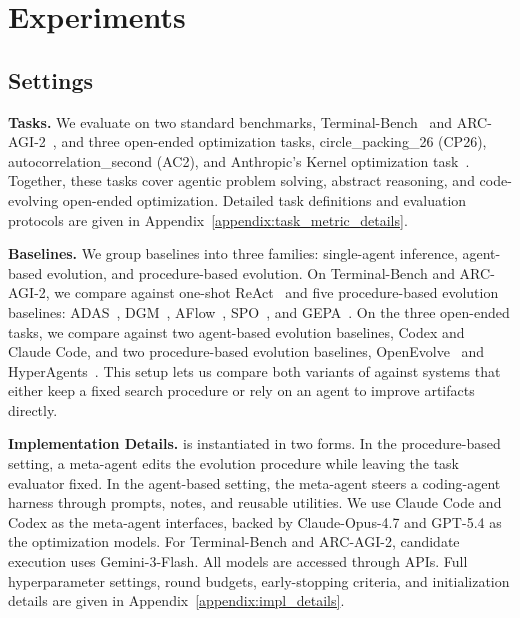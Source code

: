 \section{Experiments}

\subsection{Settings}

\textbf{Tasks.}
We evaluate \ourmethod on two standard benchmarks, Terminal-Bench~\citep{tbench_2025} and ARC-AGI-2~\citep{chollet2025arc}, and three open-ended optimization tasks, circle\_packing\_26 (CP26)\citep{cp26}, autocorrelation\_second (AC2)\citep{ac2}, and Anthropic's Kernel optimization task~\citep{takehome}. Together, these tasks cover agentic problem solving, abstract reasoning, and code-evolving open-ended optimization. Detailed task definitions and evaluation protocols are given in Appendix~\ref{appendix:task_metric_details}.

\textbf{Baselines.}
We group baselines into three families: single-agent inference, agent-based evolution, and procedure-based evolution. On Terminal-Bench and ARC-AGI-2, we compare against one-shot ReAct~\citep{yao2022react} and five procedure-based evolution baselines: ADAS~\citep{hu2024automated}, DGM~\citep{zhang2025darwin}, AFlow~\citep{zhang2024aflow}, SPO~\citep{xiang2025self}, and GEPA~\citep{agrawal2025gepa}. On the three open-ended tasks, we compare against two agent-based evolution baselines, Codex and Claude Code, and two procedure-based evolution baselines, OpenEvolve~\citep{openevolve} and HyperAgents~\citep{zhang2026hyperagents}. This setup lets us compare both variants of \ourmethod against systems that either keep a fixed search procedure or rely on an agent to improve artifacts directly.

\textbf{Implementation Details.}
\ourmethod is instantiated in two forms. In the procedure-based setting, a meta-agent edits the evolution procedure while leaving the task evaluator fixed. In the agent-based setting, the meta-agent steers a coding-agent harness through prompts, notes, and reusable utilities. We use Claude Code and Codex as the meta-agent interfaces, backed by Claude-Opus-4.7 and GPT-5.4 as the optimization models. For Terminal-Bench and ARC-AGI-2, candidate execution uses Gemini-3-Flash. All models are accessed through APIs. Full hyperparameter settings, round budgets, early-stopping criteria, and initialization details are given in Appendix~\ref{appendix:impl_details}.


